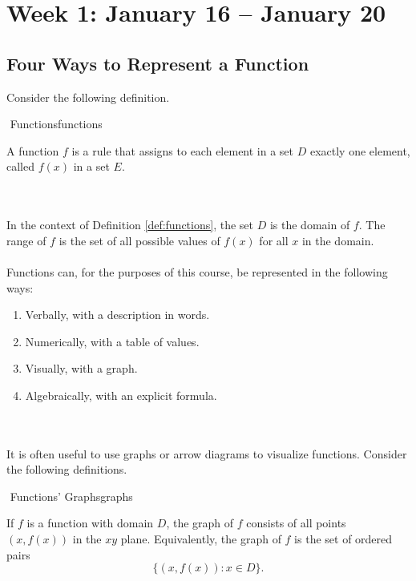 \section{Week 1: January 16 -- January 20}

    \subsection{Four Ways to Represent a Function}
		Consider the following definition.
		\begin{definition}{\Stop\,\,Functions}{functions}

			A function \(f\) is a rule that assigns to each element in a set \(D\) exactly one element, called \(f(x)\) in a set \(E\).

		\end{definition}
		\vphantom
		\\
		\\
		In the context of Definition \ref{def:functions}, the set \(D\) is the domain of \(f\). The range of \(f\) is the set of all possible values of \(f(x)\) for all \(x\) in the domain.
		\\
		\\
		Functions can, for the purposes of this course, be represented in the following ways:
		\begin{enumerate}
			\item Verbally, with a description in words.
			\item Numerically, with a table of values.
			\item Visually, with a graph.
			\item Algebraically, with an explicit formula.
		\end{enumerate}
		\pagebreak
		\vphantom
		\\
		\\
		It is often useful to use graphs or arrow diagrams to visualize functions. Consider the following definitions.
		\begin{definition}{\Stop\,\,Functions' Graphs}{graphs}
			
			If \(f\) is a function with domain \(D\), the graph of \(f\) consists of all points \((x,f(x))\) in the \(xy\) plane. Equivalently, the graph of \(f\) is the set of ordered pairs
			\begin{equation*}
				\{(x,f(x)):x\in D\}.
			\end{equation*}

		\end{definition}
